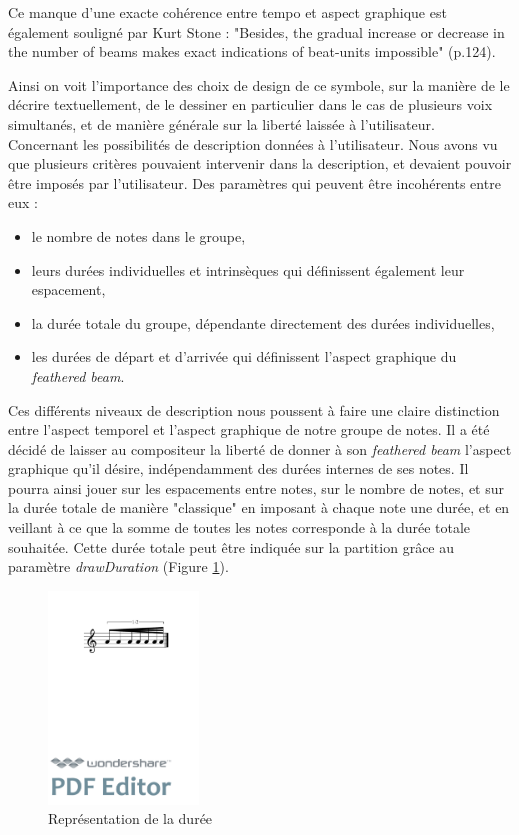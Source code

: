 \documentclass{article}
\newenvironment{gmncode}	{\vspace{-2mm}\small\verbatim}{\endverbatim\vspace{-2mm}}
\begin{document}
Ce manque d'une exacte cohérence entre tempo et aspect graphique est également souligné par Kurt Stone \cite{stone1980music} : "Besides, the gradual increase or decrease in the number of beams makes exact indications of beat-units impossible" (p.124).

Ainsi on voit l'importance des choix de design de ce symbole, sur la manière de le décrire textuellement, de le dessiner en particulier dans le cas de plusieurs voix simultanés, et de manière générale sur la liberté laissée à l'utilisateur.
\\

Concernant les possibilités de description données à l'utilisateur. Nous avons vu que plusieurs critères pouvaient intervenir dans la description, et devaient pouvoir être imposés par l'utilisateur. Des paramètres qui peuvent être incohérents entre eux :
\begin{itemize}
\item le nombre de notes dans le groupe,
\item leurs durées individuelles et intrinsèques qui définissent également leur espacement,
\item la durée totale du groupe, dépendante directement des durées individuelles,
\item les durées de départ et d'arrivée qui définissent l'aspect graphique du \emph{feathered beam}.
\end{itemize}
\bigskip

Ces différents niveaux de description nous poussent à faire une claire distinction entre l'aspect temporel et l'aspect graphique de notre groupe de notes.  Il a été décidé de laisser au compositeur la liberté de donner à son \emph{feathered beam} l'aspect graphique qu'il désire, indépendamment des durées internes de ses notes. Il pourra ainsi jouer sur les espacements entre notes, sur le nombre de notes, et sur la durée totale de manière "classique" en imposant à chaque note une durée, et en veillant à ce que la somme de toutes les notes corresponde à la durée totale souhaitée. Cette durée totale peut être indiquée sur la partition grâce au paramètre \emph{drawDuration} (Figure \ref{fig:fbeamduree}).

\begin{figure}[h]
\centering
\begin{gmncode}
[ 
  \fBeam<drawDuration="true">
  ( a/8 a a/16 a a a/32 a ) 
]
\end{gmncode}
\includegraphics[width=40mm]{img/fbeamduree.pdf}
\caption{Représentation de la durée}
\label{fig:fbeamduree}
\end{figure}
\end{document}
